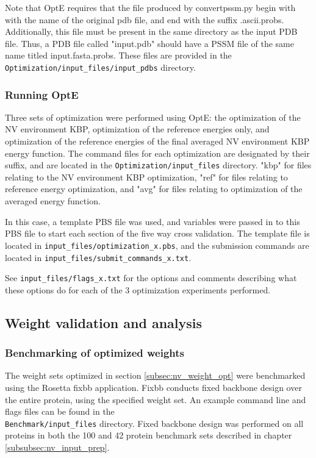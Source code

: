 Note that OptE requires that the file produced by convertpssm.py begin with with the name of the original pdb file, and end with the suffix .ascii.probs.
Additionally, this file must be present in the same directory as the input \ac{PDB} file.
Thus, a \ac{PDB} file called "input.pdb" should have a \ac{PSSM} file of the same name titled input.fasta.probs.
These files are provided in the \texttt{Optimization/input\_files/input\_pdbs} directory.

\subsubsection{Running OptE}
Three sets of optimization were performed using OptE: the optimization of the \ac{NV} environment \ac{KBP}, optimization of the reference energies only, and optimization of the reference energies of the final averaged \ac{NV} environment \ac{KBP} energy function.
The command files for each optimization are designated by their suffix, and are located in the \texttt{Optimization/input\_files} directory.
"kbp" for files relating to the \ac{NV} environment \ac{KBP} optimization, "ref" for files relating to reference energy optimization, and "avg" for files relating to optimization of the averaged energy function.  

In this case, a template \ac{PBS} file was used, and variables were passed in to this \ac{PBS} file to start each section of the five way cross validation.
The template file is located in \texttt{input\_files/optimization\_x.pbs}, and the submission commands are located in \texttt{input\_files/submit\_commands\_x.txt}.

See \texttt{input\_files/flags\_x.txt} for the options and comments describing what these options do for each of the 3 optimization experiments performed. 

\subsection{Weight validation and analysis}

\subsubsection{Benchmarking of optimized weights}

The weight sets optimized in section \ref{subsec:nv_weight_opt} were benchmarked using the Rosetta fixbb application.
Fixbb conducts fixed backbone design over the entire protein, using the specified weight set. 
An example command line and flags files can be found in the\\
\texttt{Benchmark/input\_files} directory.
Fixed backbone design was performed on all proteins in both the 100 and 42 protein benchmark sets described in chapter \ref{subsubsec:nv_input_prep}.


